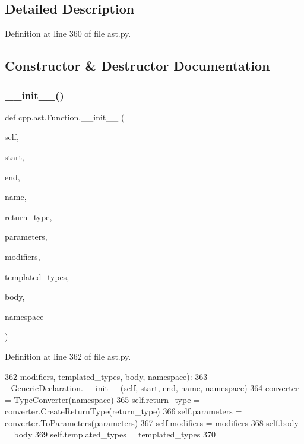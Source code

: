\subsection{Detailed Description}


Definition at line 360 of file ast.\+py.



\subsection{Constructor \& Destructor Documentation}
\mbox{\label{classcpp_1_1ast_1_1Function_ab5270f5d353ec5e9dcd136e4cc6c7f6c}} 
\subsubsection{\texorpdfstring{\+\_\+\+\_\+init\+\_\+\+\_\+()}{\_\_init\_\_()}}
{\footnotesize\ttfamily def cpp.\+ast.\+Function.\+\_\+\+\_\+init\+\_\+\+\_\+ (\begin{DoxyParamCaption}\item[{}]{self,  }\item[{}]{start,  }\item[{}]{end,  }\item[{}]{name,  }\item[{}]{return\+\_\+type,  }\item[{}]{parameters,  }\item[{}]{modifiers,  }\item[{}]{templated\+\_\+types,  }\item[{}]{body,  }\item[{}]{namespace }\end{DoxyParamCaption})}



Definition at line 362 of file ast.\+py.


\begin{DoxyCode}
362                  modifiers, templated\_types, body, namespace):
363         \_GenericDeclaration.\_\_init\_\_(self, start, end, name, namespace)
364         converter = TypeConverter(namespace)
365         self.return\_type = converter.CreateReturnType(return\_type)
366         self.parameters = converter.ToParameters(parameters)
367         self.modifiers = modifiers
368         self.body = body
369         self.templated\_types = templated\_types
370 
\end{DoxyCode}


